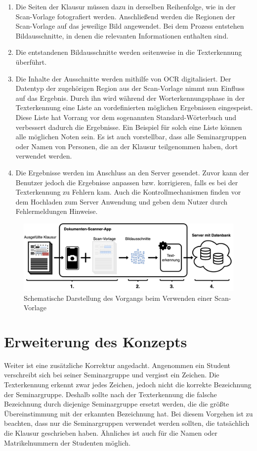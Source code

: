 \documentclass[notables, nomenclature, oneside, 150]{HSMW-Thesis}
\begin{document}
		\begin{enumerate}
			\item Die Seiten der Klausur müssen dazu in derselben Reihenfolge, wie in der Scan-Vorlage fotografiert werden. Anschließend werden die Regionen der Scan-Vorlage auf das jeweilige Bild angewendet. Bei dem Prozess entstehen Bildausschnitte, in denen die relevanten Informationen enthalten sind.
			\item Die entstandenen Bildausschnitte werden seitenweise in die Texterkennung überführt.
			\item \label{it:ocr} Die Inhalte der Ausschnitte werden mithilfe von OCR digitalisiert. Der Datentyp der zugehörigen Region aus der Scan-Vorlage nimmt nun Einfluss auf das Ergebnis. Durch ihn wird während der Worterkennungsphase in der Texterkennung eine Liste an vordefinierten möglichen Ergebnissen eingespeist. Diese Liste hat Vorrang vor dem sogenannten Standard-Wörterbuch und verbessert dadurch die Ergebnisse. Ein Beispiel für solch eine Liste können alle möglichen Noten sein. Es ist auch vorstellbar, dass alle Seminargruppen oder Namen von Personen, die an der Klausur teilgenommen haben, dort verwendet werden.
			\item Die Ergebnisse werden im Anschluss an den Server gesendet. Zuvor kann der Benutzer jedoch die Ergebnisse anpassen bzw. korrigieren, falls es bei der Texterkennung zu Fehlern kam. Auch die Kontrollmechanismen finden vor dem Hochladen zum Server Anwendung und geben dem Nutzer durch Fehlermeldungen Hinweise. \label{it:senden}
		\end{enumerate}

		\begin{figure}[h!]
    		\centering
    		\includegraphics[width=\textwidth]{img/schema2}
    		\caption{Schematische Darstellung des Vorgangs beim Verwenden einer Scan-Vorlage}
    		\label{fig:schema2}
    	\end{figure}
		
	\section{Erweiterung des Konzepts}\label{sc:erweiterungkonzept}
		Weiter ist eine zusätzliche Korrektur angedacht. Angenommen ein Student verschreibt sich bei seiner Seminargruppe und vergisst ein Zeichen. Die Texterkennung erkennt zwar jedes Zeichen, jedoch nicht die korrekte Bezeichnung der Seminargruppe. Deshalb sollte nach der Texterkennung die falsche Bezeichnung durch diejenige Seminargruppe ersetzt werden, die die größte Übereinstimmung mit der erkannten Bezeichnung hat. Bei diesem Vorgehen ist zu beachten, dass nur die Seminargruppen verwendet werden sollten, die tatsächlich die Klausur geschrieben haben. Ähnliches ist auch für die Namen oder Matrikelnummern der Studenten möglich.
		
\end{document}
